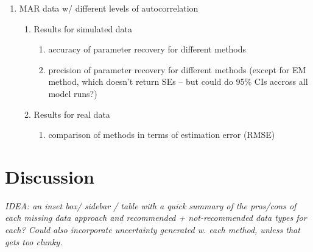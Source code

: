 \documentclass{article}
\begin{document}
\begin{enumerate}
   \item MAR data w/ different levels of autocorrelation
        \begin{enumerate}
            \item Results for simulated data
            \begin{enumerate}
                \item accuracy of parameter recovery for different methods
                \item precision of parameter recovery for different methods (except for EM method, which doesn't return SEs -- but could do 95\% CIs accross all model runs?)
            \end{enumerate}
            \item Results for real data 
            \begin{enumerate}
                 \item comparison of methods in terms of estimation error (RMSE)
            \end{enumerate}
        \end{enumerate}
\end{enumerate}


\section*{Discussion}

\textit{IDEA: an inset box/ sidebar / table with a quick summary of the pros/cons of each missing data approach and recommended + not-recommended data types for each?  Could also incorporate uncertainty generated w. each method, unless that gets too clunky. }

\end{document}
